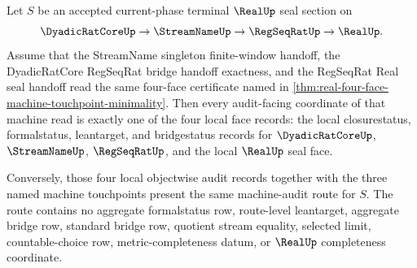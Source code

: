 \begin{theorem}
\label{thm:real-l10-machine-audit-locality}
Let $S$ be an accepted current-phase terminal $\RealUp$ seal section on
$$
\DyadicRatCoreUp \to \StreamNameUp \to \RegSeqRatUp \to \RealUp .
$$
Assume that the StreamName singleton finite-window handoff, the DyadicRatCore RegSeqRat bridge handoff exactness, and the RegSeqRat Real seal handoff read the same four-face certificate named in \autoref{thm:real-four-face-machine-touchpoint-minimality}. Then every audit-facing coordinate of that machine read is exactly one of the four local face records: the local closurestatus, formalstatus, leantarget, and bridgestatus records for $\DyadicRatCoreUp$, $\StreamNameUp$, $\RegSeqRatUp$, and the local $\RealUp$ seal face.

Conversely, those four local objectwise audit records together with the three named machine touchpoints present the same machine-audit route for $S$. The route contains no aggregate formalstatus row, route-level leantarget, aggregate bridge row, standard bridge row, quotient stream equality, selected limit, countable-choice row, metric-completeness datum, or $\RealUp$ completeness coordinate.
\end{theorem}
